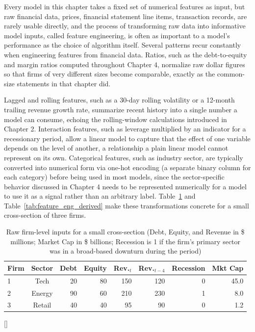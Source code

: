 \documentclass[../ai_in_finance]{subfiles}
\begin{document}
Every model in this chapter takes a fixed set of numerical features as input, but raw financial data, prices, financial statement line items, transaction records, are rarely usable directly, and the process of transforming raw data into informative model inputs, called feature engineering, is often as important to a model's performance as the choice of algorithm itself.
Several patterns recur constantly when engineering features from financial data. Ratios, such as the debt-to-equity and margin ratios computed throughout Chapter 4, normalize raw dollar figures so that firms of very different sizes become comparable, exactly as the common-size statements in that chapter did.

Lagged and rolling features, such as a 30-day rolling volatility or a 12-month trailing revenue growth rate, summarize recent history into a single number a model can consume, echoing the rolling-window calculations introduced in Chapter 2.
Interaction features, such as leverage multiplied by an indicator for a recessionary period, allow a linear model to capture that the effect of one variable depends on the level of another, a relationship a plain linear model cannot represent on its own.
Categorical features, such as industry sector, are typically converted into numerical form via one-hot encoding (a separate binary column for each category) before being used in most models, since the sector-specific behavior discussed in Chapter 4 needs to be represented numerically for a model to use it as a signal rather than an arbitrary label. Table~\ref{tab:feature_eng_raw} and Table~\ref{tab:feature_eng_derived} make these transformations concrete for a small cross-section of three firms.

\begin{table}[htbp]
\centering
\begin{lrbox}{\bookmeasuredbox}
\begin{tabular}{lcrrrrrr}
\toprule
Firm & Sector & Debt & Equity & Rev.$_t$ & Rev.$_{t-4}$ & Recession & Mkt Cap \\
\midrule
1 & Tech   & 20 & 80 & 150 & 120 & 0 & 45.0 \\
2 & Energy & 90 & 60 & 210 & 230 & 1 & 8.0 \\
3 & Retail & 40 & 40 & 95  & 90  & 0 & 1.2 \\
\bottomrule
\end{tabular}
\end{lrbox}
\ifdim\wd\bookmeasuredbox<0.65\linewidth
\setlength{\bookcapwidth}{0.65\linewidth}
\else
\setlength{\bookcapwidth}{\wd\bookmeasuredbox}
\fi
{}[\bookcapwidth]{
\usebox{\bookmeasuredbox}
}{
\caption{Raw firm-level inputs for a small cross-section (Debt, Equity, and Revenue in \$ millions; Market Cap in \$ billions; Recession is 1 if the firm's primary sector was in a broad-based downturn during the period)}
\label{tab:feature_eng_raw}
}
\end{table}
\end{document}
